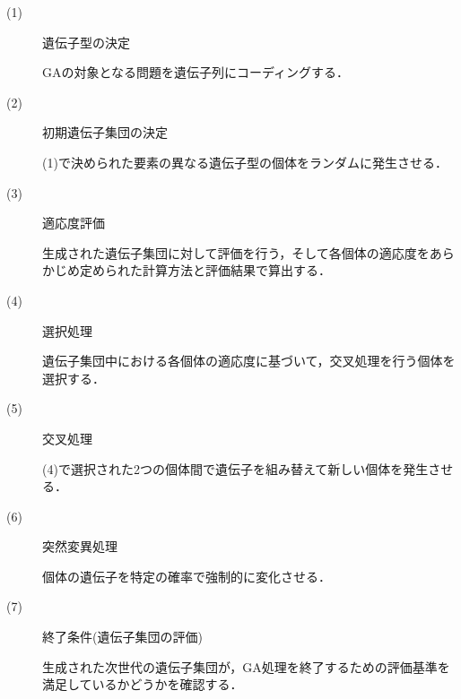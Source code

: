 \begin{description}
\item[ (1) ]遺伝子型の決定

GAの対象となる問題を遺伝子列にコーディングする．

\item[ (2) ]初期遺伝子集団の決定

(1)で決められた要素の異なる遺伝子型の個体をランダムに発生させる．

\item[ (3) ]適応度評価

生成された遺伝子集団に対して評価を行う，そして各個体の適応度をあらかじめ定められた計算方法と評価結果で算出する．

\item[ (4) ]選択処理

遺伝子集団中における各個体の適応度に基づいて，交叉処理を行う個体を選択する．

\item[ (5) ]交叉処理

(4)で選択された2つの個体間で遺伝子を組み替えて新しい個体を発生させる．

\item[ (6) ]突然変異処理

個体の遺伝子を特定の確率で強制的に変化させる．

\item[ (7) ]終了条件(遺伝子集団の評価)

生成された次世代の遺伝子集団が，GA処理を終了するための評価基準を満足しているかどうかを確認する．
\end{description}

